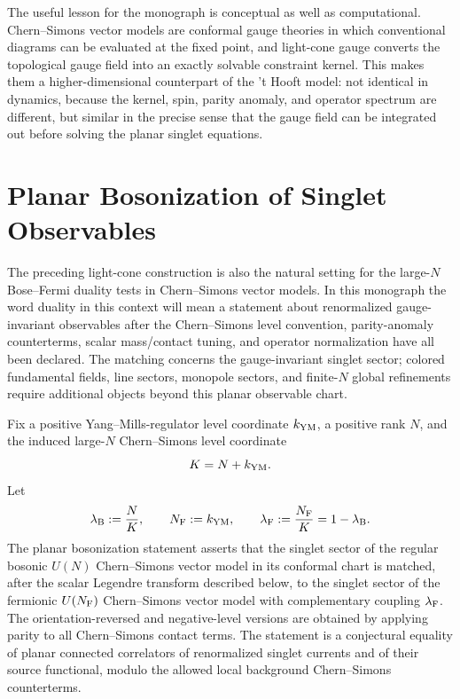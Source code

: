 The useful lesson for the monograph is conceptual as well as computational.
Chern--Simons vector models are conformal gauge theories in which conventional
diagrams can be evaluated at the fixed point, and light-cone gauge converts the
topological gauge field into an exactly solvable constraint kernel.  This makes
them a higher-dimensional counterpart of the 't Hooft model: not identical in
dynamics, because the kernel, spin, parity anomaly, and operator spectrum are
different, but similar in the precise sense that the gauge field can be
integrated out before solving the planar singlet equations.

\section{Planar Bosonization of Singlet Observables}
\label{sec:cs-vector-planar-bosonization}

The preceding light-cone construction is also the natural setting for the
large-\(N\) Bose--Fermi duality tests in Chern--Simons vector models.  In this
monograph the word duality in this context will mean a statement about
renormalized gauge-invariant observables after the Chern--Simons level
convention, parity-anomaly counterterms, scalar mass/contact tuning, and
operator normalization have all been declared.  The matching concerns the
gauge-invariant singlet sector; colored fundamental fields, line sectors,
monopole sectors, and finite-\(N\) global refinements require additional
objects beyond this planar observable chart.

\begin{conjecture}
\label{conj:planar-cs-vector-bosonization-datum}
Fix a positive Yang--Mills-regulator level coordinate \(k_{\rm YM}\), a
positive rank \(N\), and the induced large-\(N\) Chern--Simons level
coordinate
\[
  K=N+k_{\rm YM}.
\]
Let
\begin{equation}
  \lambda_{\rm B}:=\frac{N}{K},
  \qquad
  N_{\rm F}:=k_{\rm YM},
  \qquad
  \lambda_{\rm F}:=\frac{N_{\rm F}}{K}=1-\lambda_{\rm B}.
  \label{eq:cs-bosonization-rank-level-map}
\end{equation}
The planar bosonization statement asserts that the singlet sector of the
regular bosonic \(U(N)\) Chern--Simons vector model in its conformal chart is matched,
after the scalar Legendre transform described below, to the singlet sector of
the fermionic \(U(N_{\rm F})\) Chern--Simons vector model with complementary
coupling \(\lambda_{\rm F}\).  The orientation-reversed and negative-level
versions are obtained by applying parity to all Chern--Simons contact terms.
The statement is a conjectural equality of planar connected correlators of
renormalized singlet currents and of their source functional, modulo the
allowed local background Chern--Simons counterterms.
\end{conjecture}

